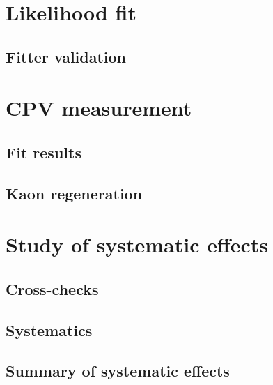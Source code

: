 \section{Likelihood fit}
\label{sec:measurement_of_sin2beta:likelihood_fit}
\subsection{Fitter validation}
\label{sec:measurement_of_sin2beta:likelihood_fit:validation}
\section{CPV measurement}
\label{sec:measurement_of_sin2beta:cpv_measurement}
\subsection{Fit results}
\label{sec:measurement_of_sin2beta:cpv_measurement:results}
\subsection{Kaon regeneration}
\section{Study of systematic effects}
\label{sec:measurement_of_sin2beta:systematics}
\subsection{Cross-checks}
\label{sec:measurement_of_sin2beta:systematics:cross_checks}
\subsection{Systematics}
\label{sec:measurement_of_sin2beta:systematics:systematics}
\subsection{Summary of systematic effects}
\label{sec:measurement_of_sin2beta:systematics:summary}

